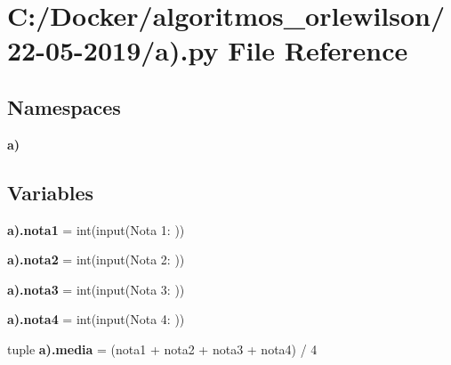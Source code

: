\section{C\+:/\+Docker/algoritmos\+\_\+orlewilson/22-\/05-\/2019/a).py File Reference}
\label{a_08_8py}
\subsection*{Namespaces}
\begin{DoxyCompactItemize}
\item 
 \textbf{ a)}
\end{DoxyCompactItemize}
\subsection*{Variables}
\begin{DoxyCompactItemize}
\item 
\textbf{ a).\+nota1} = int(input(\textquotesingle{}Nota 1\+: \textquotesingle{}))
\item 
\textbf{ a).\+nota2} = int(input(\textquotesingle{}Nota 2\+: \textquotesingle{}))
\item 
\textbf{ a).\+nota3} = int(input(\textquotesingle{}Nota 3\+: \textquotesingle{}))
\item 
\textbf{ a).\+nota4} = int(input(\textquotesingle{}Nota 4\+: \textquotesingle{}))
\item 
tuple \textbf{ a).\+media} = (nota1 + nota2 + nota3 + nota4) / 4
\end{DoxyCompactItemize}

